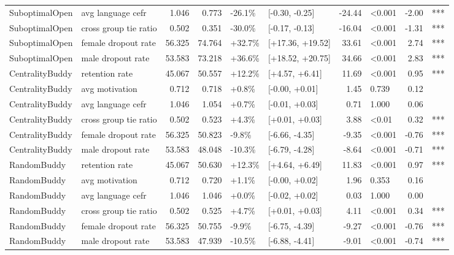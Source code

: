 \begin{longtable}[t]{llrrllrlrl}
SuboptimalOpen & avg language cefr & 1.046 & 0.773 & -26.1\% & {}[-0.30, -0.25] & -24.44 & <0.001 & -2.00 & ***\\
SuboptimalOpen & cross group tie ratio & 0.502 & 0.351 & -30.0\% & {}[-0.17, -0.13] & -16.04 & <0.001 & -1.31 & ***\\
SuboptimalOpen & female dropout rate & 56.325 & 74.764 & +32.7\% & {}[+17.36, +19.52] & 33.61 & <0.001 & 2.74 & ***\\
SuboptimalOpen & male dropout rate & 53.583 & 73.218 & +36.6\% & {}[+18.52, +20.75] & 34.66 & <0.001 & 2.83 & ***\\
\addlinespace
CentralityBuddy & retention rate & 45.067 & 50.557 & +12.2\% & {}[+4.57, +6.41] & 11.69 & <0.001 & 0.95 & ***\\
CentralityBuddy & avg motivation & 0.712 & 0.718 & +0.8\% & {}[-0.00, +0.01] & 1.45 & 0.739 & 0.12 & \\
CentralityBuddy & avg language cefr & 1.046 & 1.054 & +0.7\% & {}[-0.01, +0.03] & 0.71 & 1.000 & 0.06 & \\
CentralityBuddy & cross group tie ratio & 0.502 & 0.523 & +4.3\% & {}[+0.01, +0.03] & 3.88 & <0.01 & 0.32 & ***\\
CentralityBuddy & female dropout rate & 56.325 & 50.823 & -9.8\% & {}[-6.66, -4.35] & -9.35 & <0.001 & -0.76 & ***\\
\addlinespace
CentralityBuddy & male dropout rate & 53.583 & 48.048 & -10.3\% & {}[-6.79, -4.28] & -8.64 & <0.001 & -0.71 & ***\\
RandomBuddy & retention rate & 45.067 & 50.630 & +12.3\% & {}[+4.64, +6.49] & 11.83 & <0.001 & 0.97 & ***\\
RandomBuddy & avg motivation & 0.712 & 0.720 & +1.1\% & {}[-0.00, +0.02] & 1.96 & 0.353 & 0.16 & \\
RandomBuddy & avg language cefr & 1.046 & 1.046 & +0.0\% & {}[-0.02, +0.02] & 0.03 & 1.000 & 0.00 & \\
RandomBuddy & cross group tie ratio & 0.502 & 0.525 & +4.7\% & {}[+0.01, +0.03] & 4.11 & <0.001 & 0.34 & ***\\
\addlinespace
RandomBuddy & female dropout rate & 56.325 & 50.755 & -9.9\% & {}[-6.75, -4.39] & -9.27 & <0.001 & -0.76 & ***\\
RandomBuddy & male dropout rate & 53.583 & 47.939 & -10.5\% & {}[-6.88, -4.41] & -9.01 & <0.001 & -0.74 & ***\\*
\end{longtable}
\endgroup{}
